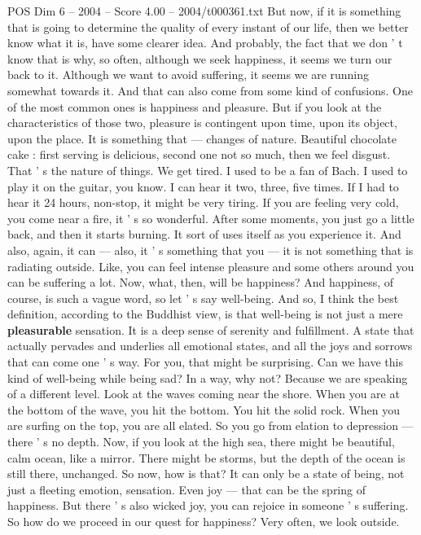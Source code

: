 \begin{textsample}{POS Dim 6 – 2004 – Score 4.00 – 2004/t000361.txt}
But now, if it is something that is going to determine the quality of every instant of our life, then we better know what it is, have some clearer idea.
And probably, the fact that we don ' t know that is why, so often, although we seek happiness, it seems we turn our back to it.
Although we want to avoid suffering, it seems we are running somewhat towards it.
And that can also come from some kind of confusions.
One of the most common ones is happiness and pleasure.
But if you look at the characteristics of those two, pleasure is contingent upon time, upon its object, upon the place.
It is something that — changes of nature.
Beautiful chocolate cake : first serving is delicious, second one not so much, then we feel disgust.
That ' s the nature of things.
We get tired.
I used to be a fan of Bach.
I used to play it on the guitar, you know.
I can hear it two, three, five times.
If I had to hear it 24 hours, non-stop, it might be very tiring.
If you are feeling very cold, you come near a fire, it ' s so wonderful.
After some moments, you just go a little back, and then it starts burning.
It sort of uses itself as you experience it.
And also, again, it can — also, it ' s something that you — it is not something that is radiating outside.
Like, you can feel intense pleasure and some others around you can be suffering a lot.
Now, what, then, will be happiness?
And happiness, of course, is such a vague word, so let ' s say well-being.
And so, I think the best definition, according to the Buddhist view, is that well-being is not just a mere \textbf{pleasurable} sensation.
It is a deep sense of serenity and fulfillment.
A state that actually pervades and underlies all emotional states, and all the joys and sorrows that can come one ' s way.
For you, that might be surprising.
Can we have this kind of well-being while being sad?
In a way, why not?
Because we are speaking of a different level.
Look at the waves coming near the shore.
When you are at the bottom of the wave, you hit the bottom.
You hit the solid rock.
When you are surfing on the top, you are all elated.
So you go from elation to depression — there ' s no depth.
Now, if you look at the high sea, there might be beautiful, calm ocean, like a mirror.
There might be storms, but the depth of the ocean is still there, unchanged.
So now, how is that?
It can only be a state of being, not just a fleeting emotion, sensation.
Even joy — that can be the spring of happiness.
But there ' s also wicked joy, you can rejoice in someone ' s suffering.
So how do we proceed in our quest for happiness?
Very often, we look outside.

\end{textsample}
